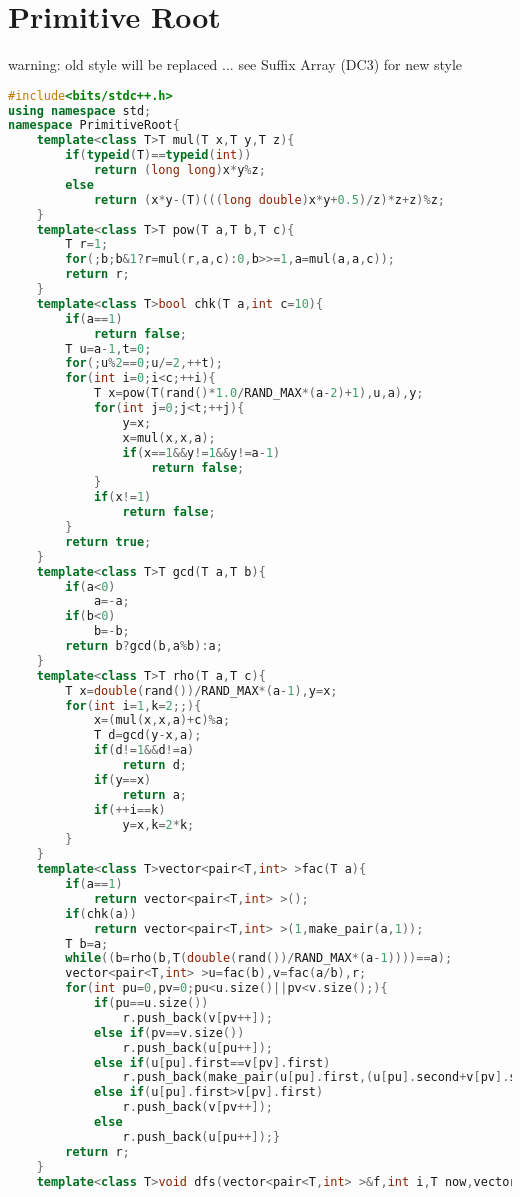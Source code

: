 \documentclass{book}
\begin{document}
\section{Primitive Root}
warning: old style will be replaced ... see Suffix Array (DC3) for new style\begin{lstlisting}[language=C++,title={Primitive Root.hpp (3256 bytes, 106 lines)}]
#include<bits/stdc++.h>
using namespace std;
namespace PrimitiveRoot{
    template<class T>T mul(T x,T y,T z){
        if(typeid(T)==typeid(int))
            return (long long)x*y%z;
        else
            return (x*y-(T)(((long double)x*y+0.5)/z)*z+z)%z;
    }
    template<class T>T pow(T a,T b,T c){
        T r=1;
        for(;b;b&1?r=mul(r,a,c):0,b>>=1,a=mul(a,a,c));
        return r;
    }
    template<class T>bool chk(T a,int c=10){
        if(a==1)
            return false;
        T u=a-1,t=0;
        for(;u%2==0;u/=2,++t);
        for(int i=0;i<c;++i){
            T x=pow(T(rand()*1.0/RAND_MAX*(a-2)+1),u,a),y;
            for(int j=0;j<t;++j){
                y=x;
                x=mul(x,x,a);
                if(x==1&&y!=1&&y!=a-1)
                    return false;
            }
            if(x!=1)
                return false;
        }
        return true;
    }
    template<class T>T gcd(T a,T b){
        if(a<0)
            a=-a;
        if(b<0)
            b=-b;
        return b?gcd(b,a%b):a;
    }
    template<class T>T rho(T a,T c){
        T x=double(rand())/RAND_MAX*(a-1),y=x;
        for(int i=1,k=2;;){
            x=(mul(x,x,a)+c)%a;
            T d=gcd(y-x,a);
            if(d!=1&&d!=a)
                return d;
            if(y==x)
                return a;
            if(++i==k)
                y=x,k=2*k;
        }
    }
    template<class T>vector<pair<T,int> >fac(T a){
        if(a==1)
            return vector<pair<T,int> >();
        if(chk(a))
            return vector<pair<T,int> >(1,make_pair(a,1));
        T b=a;
        while((b=rho(b,T(double(rand())/RAND_MAX*(a-1))))==a);
        vector<pair<T,int> >u=fac(b),v=fac(a/b),r;
        for(int pu=0,pv=0;pu<u.size()||pv<v.size();){
            if(pu==u.size())
                r.push_back(v[pv++]);
            else if(pv==v.size())
                r.push_back(u[pu++]);
            else if(u[pu].first==v[pv].first)
                r.push_back(make_pair(u[pu].first,(u[pu].second+v[pv].second))),++pu,++pv;
            else if(u[pu].first>v[pv].first)
                r.push_back(v[pv++]);
            else
                r.push_back(u[pu++]);}
        return r;
    }
    template<class T>void dfs(vector<pair<T,int> >&f,int i,T now,vector<T>&r){

\end{lstlisting}
\end{document}
